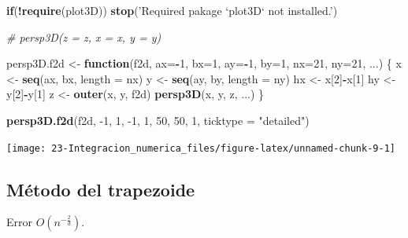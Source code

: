 \documentclass[
]{book}
\newenvironment{Shaded}{\begin{snugshade}}{\end{snugshade}}
\newcommand{\CommentTok}[1]{\textcolor[rgb]{0.56,0.35,0.01}{\textit{#1}}}
\newcommand{\ControlFlowTok}[1]{\textcolor[rgb]{0.13,0.29,0.53}{\textbf{#1}}}
\newcommand{\DataTypeTok}[1]{\textcolor[rgb]{0.13,0.29,0.53}{#1}}
\newcommand{\DecValTok}[1]{\textcolor[rgb]{0.00,0.00,0.81}{#1}}
\newcommand{\KeywordTok}[1]{\textcolor[rgb]{0.13,0.29,0.53}{\textbf{#1}}}
\newcommand{\NormalTok}[1]{#1}
\newcommand{\OperatorTok}[1]{\textcolor[rgb]{0.81,0.36,0.00}{\textbf{#1}}}
\newcommand{\StringTok}[1]{\textcolor[rgb]{0.31,0.60,0.02}{#1}}
\theoremstyle{break}
\theoremstyle{definition}
\theoremstyle{definition}
\theoremstyle{definition}
\theoremstyle{remark}
\begin{document}
\begin{Shaded}
\begin{Highlighting}[]
\ControlFlowTok{if}\NormalTok{(}\OperatorTok{!}\KeywordTok{require}\NormalTok{(plot3D)) }\KeywordTok{stop}\NormalTok{(}\StringTok{'Required pakage `plot3D` not installed.'}\NormalTok{)}

\CommentTok{# persp3D(z = z, x = x, y = y)}

\NormalTok{persp3D.f2d <-}\StringTok{ }\ControlFlowTok{function}\NormalTok{(f2d, }\DataTypeTok{ax=}\OperatorTok{-}\DecValTok{1}\NormalTok{, }\DataTypeTok{bx=}\DecValTok{1}\NormalTok{, }\DataTypeTok{ay=}\OperatorTok{-}\DecValTok{1}\NormalTok{, }\DataTypeTok{by=}\DecValTok{1}\NormalTok{, }\DataTypeTok{nx=}\DecValTok{21}\NormalTok{, }\DataTypeTok{ny=}\DecValTok{21}\NormalTok{, ...) \{ }
\NormalTok{  x <-}\StringTok{ }\KeywordTok{seq}\NormalTok{(ax, bx, }\DataTypeTok{length =}\NormalTok{ nx)}
\NormalTok{  y <-}\StringTok{ }\KeywordTok{seq}\NormalTok{(ay, by, }\DataTypeTok{length =}\NormalTok{ ny)}
\NormalTok{  hx <-}\StringTok{ }\NormalTok{x[}\DecValTok{2}\NormalTok{]}\OperatorTok{-}\NormalTok{x[}\DecValTok{1}\NormalTok{]}
\NormalTok{  hy <-}\StringTok{ }\NormalTok{y[}\DecValTok{2}\NormalTok{]}\OperatorTok{-}\NormalTok{y[}\DecValTok{1}\NormalTok{]}
\NormalTok{  z <-}\StringTok{ }\KeywordTok{outer}\NormalTok{(x, y, f2d)}
  \KeywordTok{persp3D}\NormalTok{(x, y, z, ...)}
\NormalTok{\}}

\KeywordTok{persp3D.f2d}\NormalTok{(f2d, }\DecValTok{-1}\NormalTok{, }\DecValTok{1}\NormalTok{, }\DecValTok{-1}\NormalTok{, }\DecValTok{1}\NormalTok{, }\DecValTok{50}\NormalTok{, }\DecValTok{50}\NormalTok{, }\DecValTok{1}\NormalTok{, }\DataTypeTok{ticktype =} \StringTok{"detailed"}\NormalTok{) }
\end{Highlighting}
\end{Shaded}

\begin{center}\texttt{[image: 23-Integracion\_numerica\_files/figure-latex/unnamed-chunk-9-1]} \end{center}

\hypertarget{muxe9todo-del-trapezoide-1}{%
\subsection{Método del trapezoide}\label{muxe9todo-del-trapezoide-1}}

Error \(O(n^{-\frac{2}{d}})\).
\end{document}
